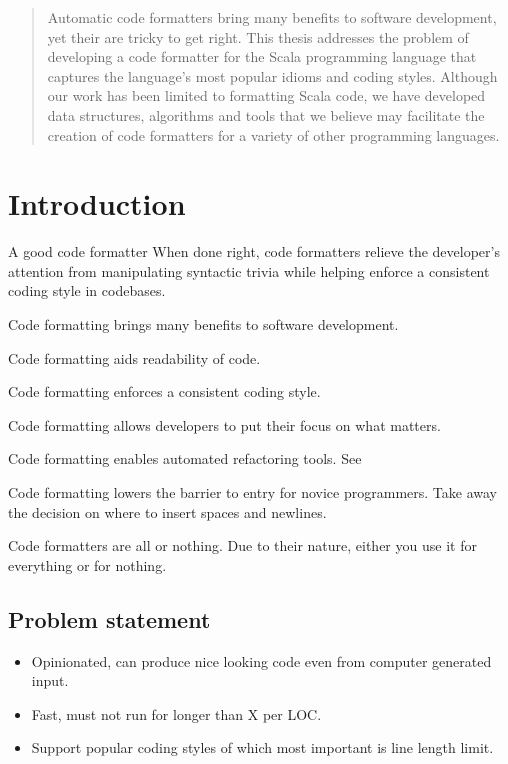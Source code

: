 \documentclass[11pt,a4paper]{article}
\begin{document}



\begin{abstract}
  Automatic code formatters bring many benefits to software development, yet their are tricky to get right.
  This thesis addresses the problem of developing a code formatter for the
  Scala programming language that captures the language's most popular idioms
  and coding styles.
  Although our work has been limited to formatting Scala code, we have developed data structures, algorithms and tools
  that we believe may facilitate the creation of code formatters for a variety of other programming languages.
\end{abstract}
\tableofcontents

\section{Introduction} %
\label{sec:Introduction}
A good code formatter
  When done right, code formatters relieve the developer's attention from manipulating
  syntactic trivia while helping enforce a consistent coding style in codebases.

Code formatting brings many benefits to software development.

Code formatting aids readability of code.

Code formatting enforces a consistent coding style.

Code formatting allows developers to put their focus on what matters.

Code formatting enables automated refactoring tools.
See~\autocite{wright_large-scale_2013}

Code formatting lowers the barrier to entry for novice programmers.
Take away the decision on where to insert spaces and newlines.

Code formatters are all or nothing.
Due to their nature, either you use it for everything or for nothing.

\subsection{Problem statement}
\begin{itemize}
  \item Opinionated, can produce nice looking code even from computer generated input.
  \item Fast, must not run for longer than X per LOC.
  \item Support popular coding styles of which most important is line length limit.
\end{itemize}
\end{document}
